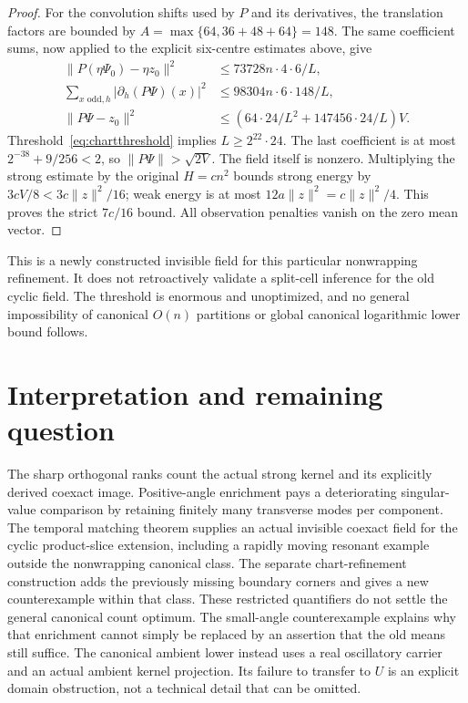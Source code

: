 \documentclass[11pt,a4paper]{article}
\newcommand{\norm}[1]{\lVert#1\rVert}
\begin{document}
\begin{proof}
For the convolution shifts used by $P$ and its derivatives, the translation
factors are bounded by $A=\max\{64,36+48+64\}=148$. The same coefficient
sums, now applied to the explicit six-centre estimates above, give
\begin{align*}
 \norm{P(\eta\Psi_0)-\eta z_0}^2
    &\leq73728n\cdot4\cdot6/L,\\
 \sum_{x\text{ odd},h}|\partial_h(P\Psi)(x)|^2
    &\leq98304n\cdot6\cdot148/L,\\
 \norm{P\Psi-z_0}^2
    &\leq(64\cdot24/L^2+147456\cdot24/L)V.
\end{align*}
Threshold~\eqref{eq:chartthreshold} implies $L\geq2^{22}\cdot24$.
The last coefficient is at most $2^{-38}+9/256<2$, so
$\norm{P\Psi}>\sqrt{2V}$. The field itself is nonzero. Multiplying the
strong estimate by the original $H=cn^2$ bounds strong energy by
$3cV/8<3c\norm z^2/16$; weak energy is at most
$12a\norm z^2=c\norm z^2/4$. This proves the strict $7c/16$ bound.
All observation penalties vanish on the zero mean vector.
\end{proof}

This is a newly constructed invisible field for this particular
nonwrapping refinement. It does not retroactively validate a split-cell
inference for the old cyclic field. The threshold is enormous and
unoptimized, and no general impossibility of canonical $O(n)$ partitions
or global canonical logarithmic lower bound follows.


\section{Interpretation and remaining question}
The sharp orthogonal ranks count the actual strong kernel and its explicitly
derived coexact image. Positive-angle enrichment pays a deteriorating
singular-value comparison by retaining finitely many transverse modes per
component. The temporal matching theorem supplies an actual invisible coexact field
for the cyclic product-slice extension, including a rapidly moving
resonant example outside the nonwrapping canonical class. The separate
chart-refinement construction adds the previously missing boundary corners
and gives a new counterexample within that class. These restricted
quantifiers do not settle the general canonical
count optimum. The small-angle counterexample explains why that enrichment cannot
simply be replaced by an assertion that the old means still suffice.
The canonical ambient lower instead uses a real oscillatory carrier and an
actual ambient kernel projection. Its failure to transfer to $U$ is an
explicit domain obstruction, not a technical detail that can be omitted.
\end{document}
